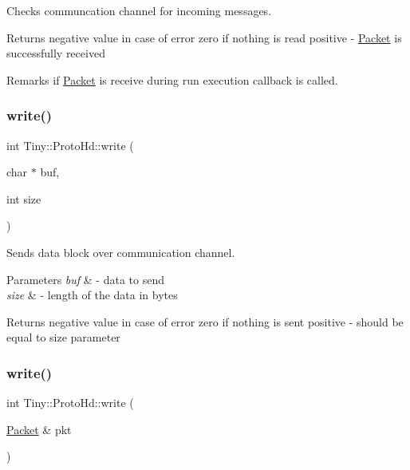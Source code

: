 Checks communcation channel for incoming messages. \begin{DoxyReturn}{Returns}
negative value in case of error zero if nothing is read positive -\/ \hyperlink{classTiny_1_1Packet}{Packet} is successfully received 
\end{DoxyReturn}
\begin{DoxyRemark}{Remarks}
if \hyperlink{classTiny_1_1Packet}{Packet} is receive during run execution callback is called. 
\end{DoxyRemark}
\mbox{\label{classTiny_1_1ProtoHd_af53c8817317d3a62535e68ca236a038f}} 
\subsubsection{\texorpdfstring{write()}{write()}\hspace{0.1cm}{\footnotesize\ttfamily [1/2]}}
{\footnotesize\ttfamily int Tiny\+::\+Proto\+Hd\+::write (\begin{DoxyParamCaption}\item[{char $\ast$}]{buf,  }\item[{int}]{size }\end{DoxyParamCaption})}

Sends data block over communication channel. 
\begin{DoxyParams}{Parameters}
{\em buf} & -\/ data to send \\
\hline
{\em size} & -\/ length of the data in bytes \\
\hline
\end{DoxyParams}
\begin{DoxyReturn}{Returns}
negative value in case of error zero if nothing is sent positive -\/ should be equal to size parameter 
\end{DoxyReturn}
\mbox{\label{classTiny_1_1ProtoHd_abffb26e95006c4e09e79f27f6ec4cdfe}} 
\subsubsection{\texorpdfstring{write()}{write()}\hspace{0.1cm}{\footnotesize\ttfamily [2/2]}}
{\footnotesize\ttfamily int Tiny\+::\+Proto\+Hd\+::write (\begin{DoxyParamCaption}\item[{\hyperlink{classTiny_1_1Packet}{Packet} \&}]{pkt }\end{DoxyParamCaption})}

